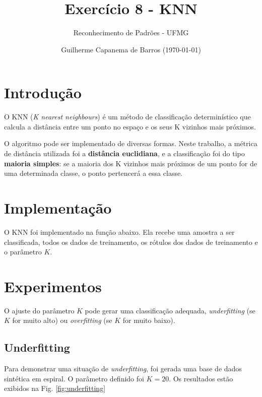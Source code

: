 \documentclass[a4paper]{article}
\title{Exercício 8 - KNN}
\author{Reconhecimento de Padrões - UFMG}
\date{\small{Guilherme Capanema de Barros (\today)}}
\begin{document}
\maketitle

\section{Introdução}

O KNN (\textit{K nearest neighbours}) é um método de classificação determinístico que calcula a distância entre um ponto no espaço e os seus K vizinhos mais próximos.

O algoritmo pode ser implementado de diversas formas. Neste trabalho, a métrica de distância utilizada foi a \textbf{distância euclidiana}, e a classificação foi do tipo \textbf{maioria simples}: se a maioria dos K vizinhos mais próximos de um ponto for de uma determinada classe, o ponto pertencerá a essa classe.

\section{Implementação}

O KNN foi implementado na função abaixo. Ela recebe uma amostra a ser classificada, todos os dados de treinamento, os rótulos dos dados de treinamento e o parâmetro $K$.



\section{Experimentos}

O ajuste do parâmetro $K$ pode gerar uma classificação adequada, \textit{underfitting} (se $K$ for muito alto) ou \textit{overfitting} (se $K$ for muito baixo).

\subsection{Underfitting}

Para demonstrar uma situação de \textit{underfitting}, foi gerada uma base de dados sintética em espiral. O parâmetro definido foi $K = 20$. Os resultados estão exibidos na Fig. \ref{fig:underfitting}
\end{document}

